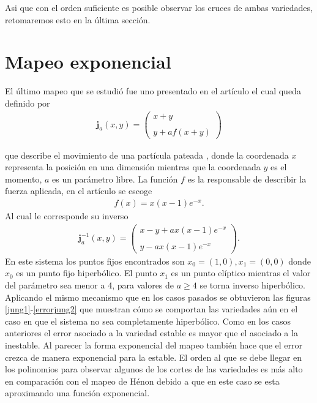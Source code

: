 Asi que con el orden suficiente es posible observar los cruces de ambas variedades, retomaremos esto en la última sección. 

\section{Mapeo exponencial}
El último mapeo que se estudió fue uno presentado en el artículo \citep{Jung} el cual queda definido por 
\begin{eqnarray}
\mathbf{j}_{a}(x,y)=\left(\begin{array}{lcc}
             x+y\\
             \\ y+af(x+y)
             \end{array}\right)
\label{Jung}
\end{eqnarray}

que describe el movimiento de una partícula pateada , donde la coordenada $x$ representa la posición en una dimensión mientras que la coordenada $y$ es el momento, $a$ es un parámetro libre. La función $f$ es la responsable de describir la fuerza aplicada, en el artículo \cite{Jung} se escoge
\begin{eqnarray*}
f(x)=x(x-1)e^{-x}.
\end{eqnarray*}
Al cual le corresponde su inverso
\begin{eqnarray}
\mathbf{j}^{-1}_{a}(x,y)=\left(\begin{array}{lcc}
             x-y+ax(x-1)e^{-x}\\
             \\ y-ax(x-1)e^{-x}
             \end{array}\right).
             \label{jungI}
\end{eqnarray}
En este sistema los puntos fijos encontrados son $x_{0}=(1,0),x_{1}=(0,0)$ donde $x_{0}$ es un punto fijo hiperbólico. El punto $x_{1}$ es un punto elíptico mientras el valor del parámetro sea menor a 4, para valores de $a \geq 4$ se torna inverso hiperbólico.\\

Aplicando el mismo mecanismo que en los casos pasados se obtuvieron las figuras \ref{jung1}-\ref{errorjung2} que muestran cómo se comportan las variedades aún en el caso en que el sistema no sea completamente hiperbólico. Como en los casos anteriores el error asociado a la variedad estable es mayor que el asociado a la inestable. Al parecer la forma exponencial del mapeo también hace que el error crezca de manera exponencial para la estable. El orden al que se debe llegar en los polinomios para observar algunos de los cortes de las variedades es más alto en comparación con el mapeo de Hénon debido a que en este caso se esta aproximando una función exponencial.

